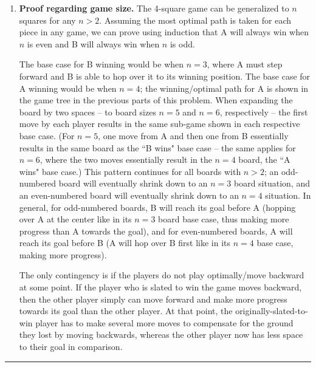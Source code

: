 \documentclass[12pt]{article}
\begin{document}
\begin{enumerate}[label=(\alph*)]
    \item \textbf{Proof regarding game size.} The 4-square game can be generalized to $n$ squares for any $n > 2$. Assuming the most optimal path is taken for each piece in any game, we can prove using induction that A will always win when $n$ is even and B will always win when $n$ is odd. 

    The base case for B winning would be when $n = 3$, where A must step forward and B is able to hop over it to its winning position. The base case for A winning would be when $n = 4$; the winning/optimal path for A is shown in the game tree in the previous parts of this problem. When expanding the board by two spaces -- to board sizes $n = 5$ and $n = 6$, respectively -- the first move by each player results in the same sub-game shown in each respective base case. (For $n = 5$, one move from A and then one from B essentially results in the same board as the ``B wins" base case -- the same applies for $n = 6$, where the two moves essentially result in the $n = 4$ board, the ``A wins" base case.) This pattern continues for all boards with $n > 2$; an odd-numbered board will eventually shrink down to an $n = 3$ board situation, and an even-numbered board will eventually shrink down to an $n = 4$ situation. In general, for odd-numbered boards, B will reach its goal before A (hopping over A at the center like in its $n = 3$ board base case, thus making more progress than A towards the goal), and for even-numbered boards, A will reach its goal before B (A will hop over B first like in its $n = 4$ base case, making more progress).

    The only contingency is if the players do not play optimally/move backward at some point. If the player who is slated to win the game moves backward, then the other player simply can move forward and make more progress towards its goal than the other player. At that point, the originally-slated-to-win player has to make several more moves to compensate for the ground they lost by moving backwards, whereas the other player now has less space to their goal in comparison.
     
\end{enumerate}


\rule{\linewidth}{0.4pt}
\vspace{.2cm}
\end{document}
